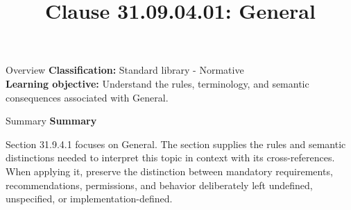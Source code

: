 \documentclass[10pt,letterpaper]{article}
\title{Clause 31.09.04.01: General}
\author{}
\date{}
\begin{document}
\maketitle
\begin{CornellOverviewBox}{Overview}
\textbf{Classification:} Standard library - Normative\\[2pt]
\textbf{Learning objective:} Understand the rules, terminology, and semantic consequences associated with General.
\end{CornellOverviewBox}\begin{CornellSummaryBox}{Summary}
{\sffamily\bfseries\color{Accent} Summary}\par\vspace{3pt}Section 31.9.4.1 focuses on General. The section supplies the rules and semantic distinctions needed to interpret this topic in context with its cross-references. When applying it, preserve the distinction between mandatory requirements, recommendations, permissions, and behavior deliberately left undefined, unspecified, or implementation-defined.
\end{CornellSummaryBox}
\end{document}
